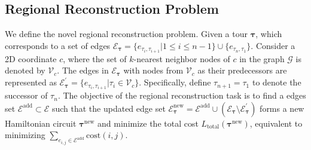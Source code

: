\subsection{Regional Reconstruction Problem}
We define the novel regional reconstruction problem. Given a tour $\boldsymbol{\tau}$, which corresponds to a set of edges $\mathcal{E}_{\boldsymbol{\tau}}=\{e_{\tau_{i},\tau_{i+1}} | 1\leq i \leq n-1\} \cup \{e_{\tau_{n},\tau_{1}}\}$. Consider a 2D coordinate $c$, where the set of $k$-nearest neighbor nodes of $c$ in the graph $\mathcal{G}$ is denoted by $\mathcal{V}_{c}$.
The edges in $\mathcal{E}_{\boldsymbol{\tau}}$ with nodes from $\mathcal{V}_{c}$ as their predecessors are represented as $\mathcal{E}_{\boldsymbol{\tau}}^{\prime}=\{e_{\tau_{i},\tau_{i+1}} | \tau_{i} \in \mathcal{V}_{c}\}$. Specifically, define $\tau_{n+1}=\tau_{1}$ to denote the successor of $\tau_{n}$. 
The objective of the regional reconstruction task is to find a edges set $\mathcal{E}^{\text{add}} \subset \mathcal{E}$ such that the updated edge set $\mathcal{E}_{\boldsymbol{\tau}}^{\text{new}} = \mathcal{E}^{\text{add}} \cup (\mathcal{E}_{\boldsymbol{\tau}} \setminus \mathcal{E}_{\boldsymbol{\tau}}^{\prime})$ forms a new Hamiltonian circuit $\boldsymbol{\tau}^\text{new}$ and minimize the total cost $L_{\text{total}}(\boldsymbol{\tau}^\text{new})$, equivalent to minimizing $\sum_{e_{i,j}\in \mathcal{E}^{\text{add}}} {\text{cost}(i,j)}$. 
